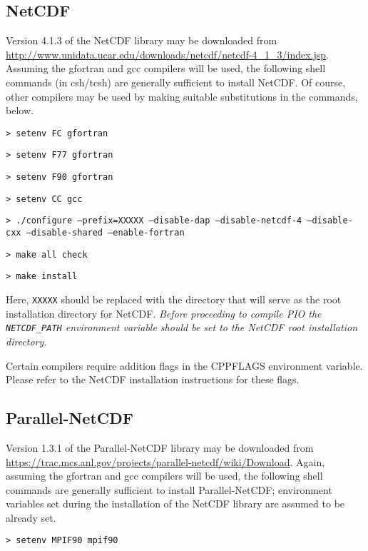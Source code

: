 \subsection{NetCDF}
\label{serial_netcdf}

Version 4.1.3 of the NetCDF library may be downloaded from
\url{http://www.unidata.ucar.edu/downloads/netcdf/netcdf-4\_1\_3/index.jsp}.
Assuming the gfortran and gcc compilers will be used, the following shell
commands (in csh/tcsh) are generally sufficient to install NetCDF. Of course, other compilers
may be used by making suitable substitutions in the commands, below.

\vspace{12pt}
{\tt > setenv FC gfortran}

{\tt > setenv F77 gfortran} 

{\tt > setenv F90 gfortran}

{\tt > setenv CC gcc} 

{\tt > ./configure --prefix=XXXXX --disable-dap --disable-netcdf-4 --disable-cxx \hfill\break --disable-shared --enable-fortran} 

{\tt > make all check}

{\tt > make install}
\vspace{12pt}

Here, {\tt XXXXX} should be replaced with the directory that will serve as the
root installation directory for NetCDF.  {\em Before proceeding to compile PIO
the {\tt NETCDF\_PATH} environment variable should be set to the NetCDF root
installation directory.}

Certain compilers require addition flags in the CPPFLAGS environment variable.
Please refer to the NetCDF installation instructions for these flags.

\subsection{Parallel-NetCDF}
\label{parallel_netcdf}

Version 1.3.1 of the Parallel-NetCDF library may be downloaded from
\url{https://trac.mcs.anl.gov/projects/parallel-netcdf/wiki/Download}. Again, assuming
the gfortran and gcc compilers will be used, the following shell commands are
generally sufficient to install Parallel-NetCDF; environment variables set during the
installation of the NetCDF library are assumed to be already set.

\vspace{12pt}
{\tt > setenv MPIF90 mpif90}

